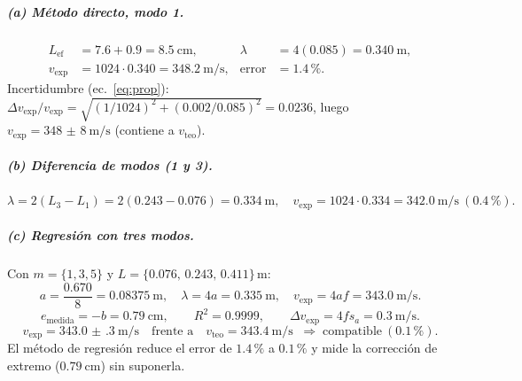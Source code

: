 \documentclass[11pt,a4paper]{article}
\newcommand{\vexp}{v_{\text{exp}}}
\newcommand{\vteo}{v_{\text{teo}}}
\begin{document}
\subparagraph{(a) Método directo, modo 1.}
\begin{align*}
  L_{\text{ef}} &= 7.6+0.9 = \SI{8.5}{\centi\meter}, &
  \lambda &= 4(0.085) = \SI{0.340}{\meter},\\
  \vexp &= 1024\cdot 0.340 = \SI{348.2}{\meter\per\second}, &
  \text{error} &= 1.4\,\%.
\end{align*}
Incertidumbre (ec.~\eqref{eq:prop}): $\Delta\vexp/\vexp=\sqrt{(1/1024)^2+(0.002/0.085)^2}=0.0236$,
luego $\vexp = \SI{348(8)}{\meter\per\second}$ (contiene a $\vteo$).

\subparagraph{(b) Diferencia de modos (1 y 3).}
\[
  \lambda = 2(L_3-L_1) = 2(0.243-0.076) = \SI{0.334}{\meter},\quad
  \vexp = 1024\cdot 0.334 = \SI{342.0}{\meter\per\second}\ (0.4\,\%).
\]

\subparagraph{(c) Regresión con tres modos.}
Con $m=\{1,3,5\}$ y $L=\{0.076,\,0.243,\,0.411\}\,\si{\meter}$:
\[
  a = \frac{0.670}{8} = \SI{0.08375}{\meter},\quad
  \lambda = 4a = \SI{0.335}{\meter},\quad
  \vexp = 4af = \SI{343.0}{\meter\per\second}.
\]
\[
  e_{\text{medida}} = -b = \SI{0.79}{\centi\meter},\qquad R^2 = 0.9999,\qquad
  \Delta\vexp = 4f s_a = \SI{0.3}{\meter\per\second}.
\]
\[
  \boxed{\;\vexp = \SI{343.0(3)}{\meter\per\second}\quad\text{frente a}\quad
  \vteo=\SI{343.4}{\meter\per\second}\;\;\Rightarrow\;\text{compatible}\ (0.1\,\%).\;}
\]
El método de regresión reduce el error de $1.4\,\%$ a $0.1\,\%$ y mide la corrección de
extremo ($\SI{0.79}{\centi\meter}$) sin suponerla.
\end{document}
